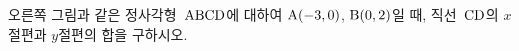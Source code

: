 \noindent\begin{minipage}[t]{0.58\linewidth}\vspace{0pt}\raggedright 오른쪽 그림과 같은 정사각형~$\mathrm{ABCD}$에 대하여 $\mathrm{A}(-3{,}\mkern3mu\mathopen{}0)$, $\mathrm{B}(0{,}\mkern3mu\mathopen{}2)$일 때, 직선~$\mathrm{CD}$의 $x$절편과 $y$절편의 합을 구하시오. \end{minipage}\hfill\begin{minipage}[t]{0.4\linewidth}\vspace{0pt}\centering \resizebox{\ifdim\width>\linewidth\linewidth\else\width\fi}{!}{}\end{minipage}\par
